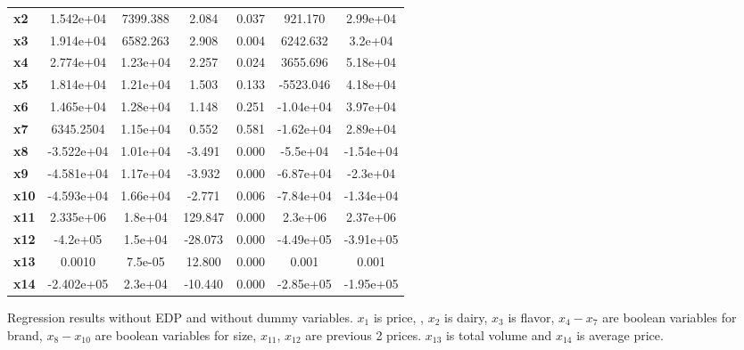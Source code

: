 \documentclass{article}
\begin{document}
\begin{center}
{\begin{tabular}{lcccccc}
\textbf{x2}    &    1.542e+04  &     7399.388     &     2.084  &         0.037        &      921.170    &     2.99e+04     \\
\textbf{x3}    &    1.914e+04  &     6582.263     &     2.908  &         0.004        &     6242.632    &      3.2e+04     \\
\textbf{x4}    &    2.774e+04  &     1.23e+04     &     2.257  &         0.024        &     3655.696    &     5.18e+04     \\
\textbf{x5}    &    1.814e+04  &     1.21e+04     &     1.503  &         0.133        &    -5523.046    &     4.18e+04     \\
\textbf{x6}    &    1.465e+04  &     1.28e+04     &     1.148  &         0.251        &    -1.04e+04    &     3.97e+04     \\
\textbf{x7}    &    6345.2504  &     1.15e+04     &     0.552  &         0.581        &    -1.62e+04    &     2.89e+04     \\
\textbf{x8}    &   -3.522e+04  &     1.01e+04     &    -3.491  &         0.000        &     -5.5e+04    &    -1.54e+04     \\
\textbf{x9}    &   -4.581e+04  &     1.17e+04     &    -3.932  &         0.000        &    -6.87e+04    &     -2.3e+04     \\
\textbf{x10}   &   -4.593e+04  &     1.66e+04     &    -2.771  &         0.006        &    -7.84e+04    &    -1.34e+04     \\
\textbf{x11}   &    2.335e+06  &      1.8e+04     &   129.847  &         0.000        &      2.3e+06    &     2.37e+06     \\
\textbf{x12}   &     -4.2e+05  &      1.5e+04     &   -28.073  &         0.000        &    -4.49e+05    &    -3.91e+05     \\
\textbf{x13}   &       0.0010  &      7.5e-05     &    12.800  &         0.000        &        0.001    &        0.001     \\
\textbf{x14}   &   -2.402e+05  &      2.3e+04     &   -10.440  &         0.000        &    -2.85e+05    &    -1.95e+05     \\
\bottomrule
\end{tabular}}
\caption{Regression results without EDP and without dummy variables. $x_1$ is price, , $x_2$ is dairy, $x_3$ is flavor, $x_4-x_7$ are boolean variables for brand, $x_8-x_{10}$ are boolean variables for size, $x_{11}$, $x_{12}$ are previous 2 prices. $x_{13}$ is total volume and $x_{14}$ is average price.}
\end{center}
\end{document}
